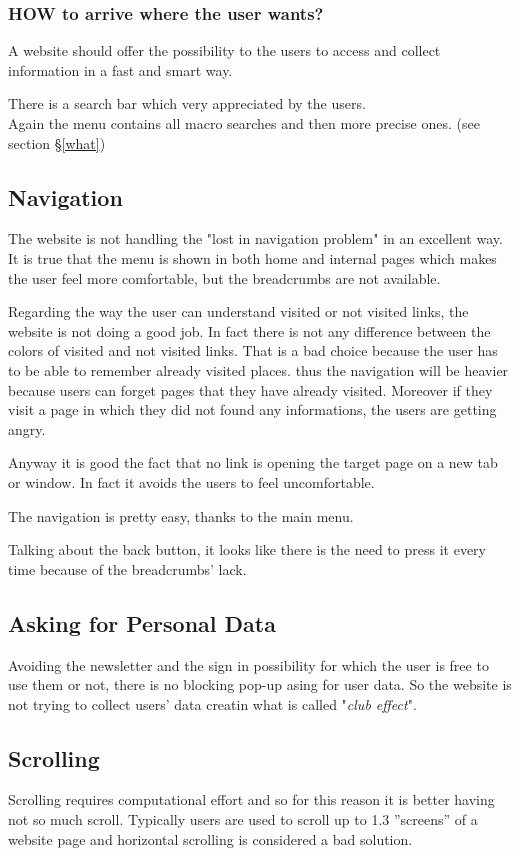 \subsubsection{HOW to arrive where the user wants?}
A website should offer the possibility to the users to access
and collect information in a fast and smart way.

There is a search bar which very appreciated by the users.\\
Again the menu contains all macro searches and then more precise ones. (see section §\ref{what})

\subsection{Navigation}
The website is not handling the "lost in navigation problem" in an excellent way.
It is true that the menu is shown in both home and internal pages which makes
the user feel more comfortable, but the breadcrumbs are not available.

Regarding the way 
the user can understand visited or not visited links, the website is not doing a good job.
In fact there is not any difference
between the colors of visited and not visited links. That is a bad choice because the user has to
be able to remember already visited places. thus the navigation will be heavier because users can forget
pages that they have already visited. Moreover if they visit a page in which they did not found any informations,
the users are getting angry.

Anyway it is good the fact that no link is opening the target page on a
new tab or window. In fact it avoids the users to feel
uncomfortable.

The navigation is pretty easy, thanks to the main menu.

Talking about the
back button, it looks like there is the need to press it every time because of the breadcrumbs' lack.

\subsection{Asking for Personal Data}
\label{ask-personal-data}
Avoiding the newsletter and the sign in possibility for which the user is free to use them or not,
there is no blocking pop-up asing for user data. So the website is not trying to collect users' data creatin
what is called "\textit{club effect}".

\subsection{Scrolling}
Scrolling requires computational effort and so for this reason it is better having not so much scroll.
Typically users are used to scroll up to 1.3 ”screens” of a website page and horizontal scrolling is
considered a bad solution.


